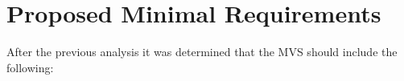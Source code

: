 \documentclass{l4proj}
\begin{document}


\section{Proposed Minimal Requirements}

After the previous analysis it was determined that the MVS should include the following:
\end{document}
